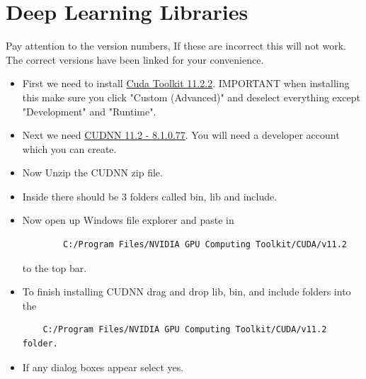 \documentclass[11pt]{report}
\begin{document}
\section{Deep Learning Libraries}
Pay attention to the version numbers, If these are incorrect this will not work. The correct versions have been linked for your convenience.
\begin{itemize}
    \item First we need to install \href{https://developer.nvidia.com/cuda-11.2.2-download-archive?target_os=Windows&target_arch=x86_64&target_version=10&target_type=exenetwork}{Cuda Toolkit 11.2.2}. IMPORTANT when installing this make sure you click "Custom (Advanced)" and deselect everything except "Development" and "Runtime".
    \item Next we need \href{https://developer.nvidia.com/compute/machine-learning/cudnn/secure/8.1.0.77/11.2_20210127/cudnn-11.2-windows-x64-v8.1.0.77.zip}{CUDNN 11.2 - 8.1.0.77}. You will need a developer account which you can create.
    \item Now Unzip the CUDNN zip file.
    \item Inside there should be 3 folders called bin, lib and include.
    \item Now open up Windows file explorer and paste in \begin{verbatim}
        C:/Program Files/NVIDIA GPU Computing Toolkit/CUDA/v11.2 
    \end{verbatim} 
    to the top bar.
    \item To finish installing CUDNN drag and drop lib, bin, and include folders into the 
    \begin{verbatim}
    C:/Program Files/NVIDIA GPU Computing Toolkit/CUDA/v11.2 folder.
    \end{verbatim}
    \item If any dialog boxes appear select yes.
\end{itemize}
\end{document}
